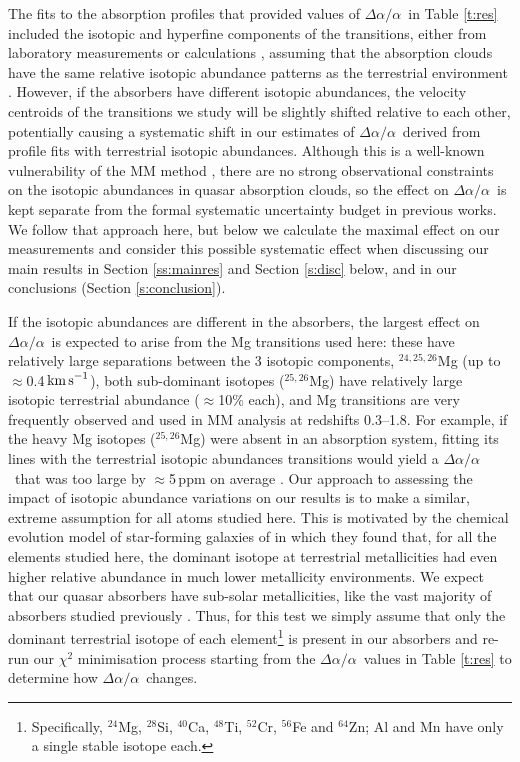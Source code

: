 \documentclass[fleqn,usenatbib,usedcolumn]{mnras}
\newcommand{\Sref}[1]{Section \ref{#1}}
\newcommand{\Tref}[1]{Table \ref{#1}}
\newcommand{\kms}{\ensuremath{\textrm{km\,s}^{-1}}}
\newcommand{\daa}{\ensuremath{\Delta\alpha/\alpha}}
\begin{document}
The fits to the absorption profiles that provided values of \daa\ in \Tref{t:res} included the isotopic and hyperfine components of the transitions, either from laboratory measurements or calculations \citep[reviewed in][]{Murphy:2014:388}, assuming that the absorption clouds have the same relative isotopic abundance patterns as the terrestrial environment \citep{Rosman:1998:1275}. However, if the absorbers have different isotopic abundances, the velocity centroids of the transitions we study will be slightly shifted relative to each other, potentially causing a systematic shift in our estimates of \daa\ derived from profile fits with terrestrial isotopic abundances. Although this is a well-known vulnerability of the MM method \citep[e.g.][]{Murphy:2001:1223,Murphy:2004:131}, there are no strong observational constraints on the isotopic abundances in quasar absorption clouds, so the effect on \daa\ is kept separate from the formal systematic uncertainty budget in previous works. We follow that approach here, but below we calculate the maximal effect on our measurements and consider this possible systematic effect when discussing our main results in \Sref{ss:mainres} and \Sref{s:disc} below, and in our conclusions (\Sref{s:conclusion}).

If the isotopic abundances are different in the absorbers, the largest effect on \daa\ is expected to arise from the Mg transitions used here: these have relatively large separations between the 3 isotopic components, $^{24,25,26}$Mg (up to $\approx$0.4\,\kms), both sub-dominant isotopes ($^{25,26}$Mg) have relatively large isotopic terrestrial abundance ($\approx$10\% each), and Mg transitions are very frequently observed and used in MM analysis at redshifts 0.3--1.8. For example, if the heavy Mg isotopes ($^{25,26}$Mg) were absent in an absorption system, fitting its  lines with the terrestrial isotopic abundances transitions would yield a \daa\ that was too large by $\approx$5\,ppm on average \citep[when, as in typical MM analyses, the  transitions are compared with the most common  transitions;][]{Fenner:2005:468}. Our approach to assessing the impact of isotopic abundance variations on our results is to make a similar, extreme assumption for all atoms studied here. This is motivated by the chemical evolution model of star-forming galaxies of \citet{Fenner:2005:468} in which they found that, for all the elements studied here, the dominant isotope at terrestrial metallicities had even higher relative abundance in much lower metallicity environments. We expect that our quasar absorbers have sub-solar metallicities, like the vast majority of absorbers studied previously \citep[e.g.][]{Rafelski:2012:89,Jorgenson:2013:482,Cooper:2015:58,Lehner:2016:283,Glidden:2016:270}. Thus, for this test we simply assume that only the dominant terrestrial isotope of each element\footnote{Specifically, $^{24}$Mg, $^{28}$Si, $^{40}$Ca, $^{48}$Ti, $^{52}$Cr, $^{56}$Fe and $^{64}$Zn; Al and Mn have only a single stable isotope each.} is present in our absorbers and re-run our $\chi^2$ minimisation process starting from the \daa\ values in \Tref{t:res} to determine how \daa\ changes.
\end{document}
